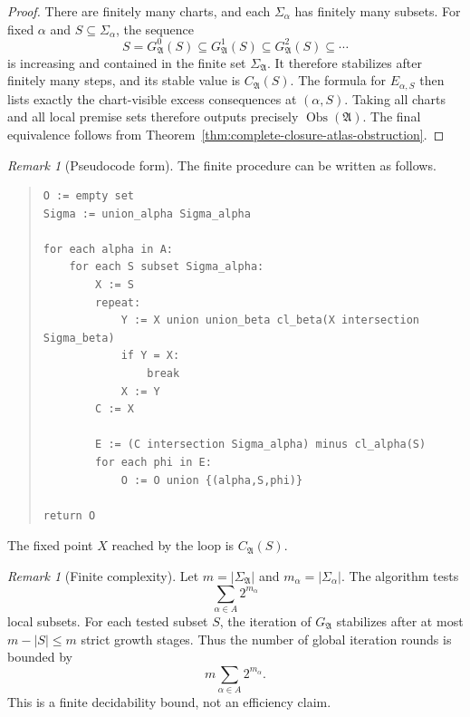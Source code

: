 \documentclass[11pt]{amsart}
\numberwithin{equation}{section}
\theoremstyle{plain}
\theoremstyle{definition}
\theoremstyle{remark}
\newtheorem{remark}[theorem]{Remark}
\newcommand{\A}{\mathfrak A}
\newcommand{\Sig}{\Sigma}
\newcommand{\Obs}{\operatorname{Obs}}
\newcommand{\CA}{C_{\mathfrak A}}
\newcommand{\GA}{G_{\mathfrak A}}
\begin{document}
\begin{proof}
There are finitely many charts, and each \(\Sig_\alpha\) has finitely many subsets.  For fixed \(\alpha\) and \(S\subseteq\Sig_\alpha\), the sequence
\[
  S=\GA^0(S)\subseteq\GA^1(S)\subseteq\GA^2(S)\subseteq\cdots
\]
is increasing and contained in the finite set \(\Sig_{\A}\).  It therefore stabilizes after finitely many steps, and its stable value is \(\CA(S)\).  The formula for \(E_{\alpha,S}\) then lists exactly the chart-visible excess consequences at \((\alpha,S)\).  Taking all charts and all local premise sets therefore outputs precisely \(\Obs(\A)\).  The final equivalence follows from Theorem~\ref{thm:complete-closure-atlas-obstruction}.
\end{proof}

\begin{remark}[Pseudocode form]
The finite procedure can be written as follows.
\begin{quote}
\begin{verbatim}
O := empty set
Sigma := union_alpha Sigma_alpha

for each alpha in A:
    for each S subset Sigma_alpha:
        X := S
        repeat:
            Y := X union union_beta cl_beta(X intersection Sigma_beta)
            if Y = X:
                break
            X := Y
        C := X

        E := (C intersection Sigma_alpha) minus cl_alpha(S)
        for each phi in E:
            O := O union {(alpha,S,phi)}

return O
\end{verbatim}
\end{quote}
The fixed point \(X\) reached by the loop is \(\CA(S)\).
\end{remark}

\begin{remark}[Finite complexity]
Let \(m=|\Sig_{\A}|\) and \(m_\alpha=|\Sig_\alpha|\).  The algorithm tests
\[
  \sum_{\alpha\in A}2^{m_\alpha}
\]
local subsets.  For each tested subset \(S\), the iteration of \(\GA\) stabilizes after at most \(m-|S|\leq m\) strict growth stages.  Thus the number of global iteration rounds is bounded by
\[
  m\sum_{\alpha\in A}2^{m_\alpha}.
\]
This is a finite decidability bound, not an efficiency claim.
\end{remark}
\end{document}
